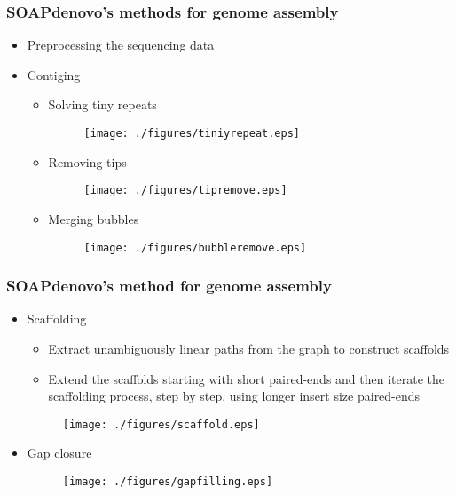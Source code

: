 \documentclass[mathserif]{beamer}
\begin{document}
	\begin{frame}
		\frametitle{SOAPdenovo's methods for genome assembly}
		\begin{itemize}
			\item Preprocessing the sequencing data
			\item Contiging
			\begin{itemize}
				\item Solving tiny repeats
				\begin{figure}
					\centering
					\texttt{[image: ./figures/tiniyrepeat.eps]}
				\end{figure}
				\item Removing tips
				\begin{figure}
					\centering
					\texttt{[image: ./figures/tipremove.eps]}
				\end{figure}
				\item Merging bubbles
				\begin{figure}
					\centering
					\texttt{[image: ./figures/bubbleremove.eps]}
				\end{figure}
			\end{itemize}
		\end{itemize}
	\end{frame}
	\begin{frame}
		\frametitle{SOAPdenovo's method for genome assembly}
		\begin{itemize}
			\item Scaffolding
			\begin{itemize}
				\item Extract unambiguously linear paths from the graph to construct scaffolds
				\item Extend the scaffolds starting with short paired-ends and then iterate the scaffolding process, step by step, using longer insert size paired-ends
			\end{itemize}
			\begin{figure}
				\centering
				\texttt{[image: ./figures/scaffold.eps]}
			\end{figure}
			\item Gap closure
			\begin{figure}
				\centering
				\texttt{[image: ./figures/gapfilling.eps]}
			\end{figure}
		\end{itemize}
	\end{frame}
	
\end{document}
